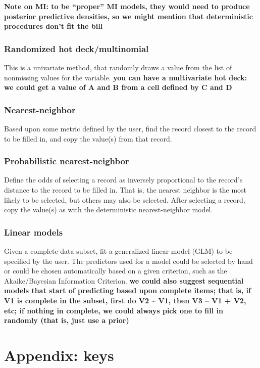 \documentclass{article}
\begin{document}
{{\bf Note on MI: to be ``proper'' MI models, they would need to produce
posterior predictive densities, so we might mention that deterministic
procedures don't fit the bill}

\subsubsection{Randomized hot deck/multinomial} This is a univariate method, that 
randomly draws a value from the list of nonmissing values for the variable.
{\bf you can have a multivariate hot deck: we could get a value of A and B
from a cell defined by C and D}

\subsubsection{Nearest-neighbor} Based upon some metric defined by the user, find the
record closest to the record to be filled in, and copy the value(s) from that
record.

\subsubsection{Probabilistic nearest-neighbor} Define the odds of selecting a record
as inversely proportional to the record's distance to the record to be filled
in. That is, the nearest neighbor is the most likely to be selected, but others
may also be selected. After selecting a record, copy the value(s) as with
the deterministic nearest-neighbor model.

\subsubsection{Linear models} Given a complete-data subset, fit a generalized linear
model (GLM) to be specified by the user. The predictors used for a model could
be selected by hand or could be chosen automatically based on a given
criterion, such as the Akaike/Bayesian Information Criterion.
{\bf we could also suggest sequential models that start of predicting based
upon complete items; that is, if V1 is complete in the subset, first do
V2 \~{} V1, then V3 \~{} V1 + V2, etc; if nothing in complete, we could
always pick one to fill in randomly (that is, just use a prior)}

}



\section*{Appendix: keys}
\end{document}
